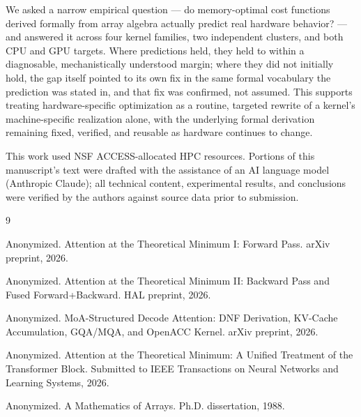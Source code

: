 \documentclass[sigconf,review,anonymous]{acmart}
\begin{document}
We asked a narrow empirical question --- do memory-optimal cost
functions derived formally from array algebra actually predict real
hardware behavior? --- and answered it across four kernel families, two
independent clusters, and both CPU and GPU targets. Where predictions
held, they held to within a diagnosable, mechanistically understood
margin; where they did not initially hold, the gap itself pointed to
its own fix in the same formal vocabulary the prediction was stated in,
and that fix was confirmed, not assumed. This supports treating
hardware-specific optimization as a routine, targeted rewrite of a
kernel's machine-specific realization alone, with the underlying formal
derivation remaining fixed, verified, and reusable as hardware
continues to change.

\begin{acks}
This work used NSF ACCESS-allocated HPC resources. Portions of this
manuscript's text were drafted with the assistance of an AI language
model (Anthropic Claude); all technical content, experimental results,
and conclusions were verified by the authors against source data prior
to submission.
\end{acks}

\begin{thebibliography}{9}

Anonymized. Attention at the Theoretical Minimum I: Forward Pass.
arXiv preprint, 2026.

Anonymized. Attention at the Theoretical Minimum II: Backward Pass and
Fused Forward+Backward. HAL preprint, 2026.

Anonymized. MoA-Structured Decode Attention: DNF Derivation, KV-Cache
Accumulation, GQA/MQA, and OpenACC Kernel. arXiv preprint, 2026.

Anonymized. Attention at the Theoretical Minimum: A Unified Treatment
of the Transformer Block. Submitted to IEEE Transactions on Neural
Networks and Learning Systems, 2026.

Anonymized. A Mathematics of Arrays. Ph.D. dissertation, 1988.

\end{thebibliography}
\end{document}

